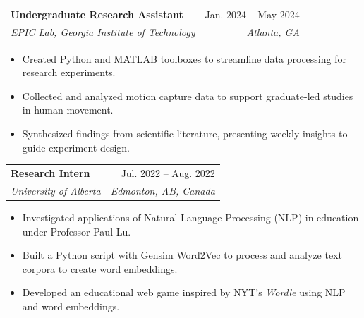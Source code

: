\documentclass[letterpaper,11pt]{article}
\makeatletter
\newcommand{\resumeItem}[1]{
  \item\small{
    {#1 \vspace{-2pt}}
  }
}
\newcommand{\resumeSubheading}[4]{
  \vspace{-2pt}\item
    \begin{tabular*}{0.97\textwidth}[t]{l@{\extracolsep{\fill}}r}
      \textbf{\small#1} & \small #2 \\
      \textit{\small#3} & \textit{\small #4} \\
    \end{tabular*}\vspace{-5pt}
}
\newcommand{\resumeSubSubheading}[2]{
    \item
    \begin{tabular*}{0.97\textwidth}{l@{\extracolsep{\fill}}r}
      \textit{\small#1} & \textit{\small #2} \\
    \end{tabular*}\vspace{-5pt}
}
\newcommand{\resumeSubHeadingListEnd}{\end{itemize}}
\newcommand{\resumeItemListStart}{\begin{itemize}}
\newcommand{\resumeItemListEnd}{\end{itemize}\vspace{-5pt}}
\makeatother
\begin{document}

    \resumeSubheading
      {Undergraduate Research Assistant}{Jan. 2024 -- May 2024}
      {EPIC Lab, Georgia Institute of Technology}{Atlanta, GA}
      \resumeItemListStart
        \resumeItem{Created Python and MATLAB toolboxes to streamline data processing for research experiments.}
        \resumeItem{Collected and analyzed motion capture data to support graduate-led studies in human movement.}
        \resumeItem{Synthesized findings from scientific literature, presenting weekly insights to guide experiment design.}
    \resumeItemListEnd

    \resumeSubheading
      {Research Intern}{Jul. 2022 -- Aug. 2022}
      {University of Alberta}{Edmonton, AB, Canada}
      \resumeItemListStart
        \resumeItem{Investigated applications of Natural Language Processing (NLP) in education under Professor Paul Lu.}
        \resumeItem{Built a Python script with Gensim Word2Vec to process and analyze text corpora to create word embeddings.}
        \resumeItem{Developed an educational web game inspired by NYT's \emph{Wordle} using NLP and word embeddings.}
      \resumeItemListEnd
\end{document}
